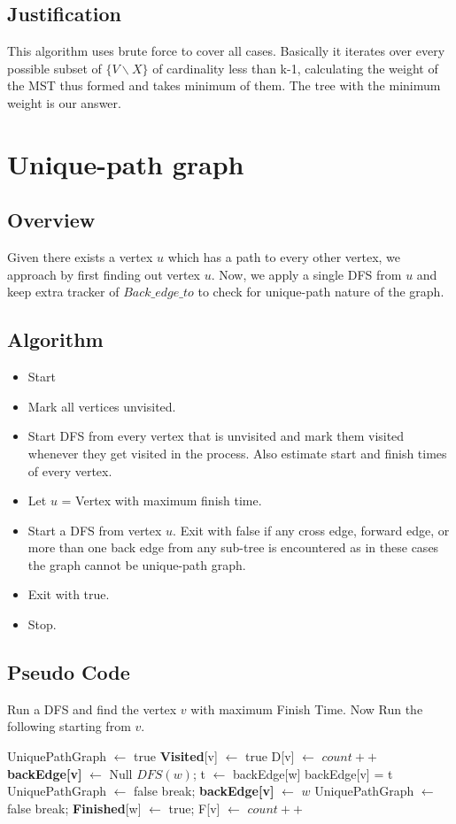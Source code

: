 \documentclass{article}
\begin{document}
\subsection{Justification}
This algorithm uses brute force to cover all cases. Basically it iterates over every possible subset of $\{V\backslash X\}$ of cardinality less than k-1, calculating the weight of the MST thus formed and takes minimum of them. The tree with the minimum weight is our answer.\\  

\newpage
\section{Unique-path graph}
\subsection{Overview}
Given there exists a vertex $u$ which has a path to every other vertex, we approach by first finding out vertex $u$. Now, we apply a single DFS from $u$ and keep extra tracker of $Back\_edge\_to$ to check for unique-path nature of the graph.
\subsection{Algorithm}
\begin{itemize}
\item Start
\item Mark all vertices unvisited. 
\item Start DFS from every vertex that is unvisited and mark them visited whenever they get visited in the process. Also estimate start and finish times of every vertex.
\item Let $u$ = Vertex with maximum finish time.
\item Start a DFS from vertex $u$. Exit with false if any cross edge, forward edge, or more than one back edge from any sub-tree is encountered as in these cases the graph cannot be unique-path graph.
\item Exit with true.
\item Stop.  
\end{itemize}
\subsection{Pseudo Code}
Run a DFS and find the vertex $v$ with maximum Finish Time. Now Run the following starting from $v$. 
\begin{algorithmic}[1]
\State UniquePathGraph $\gets$ true
\State \textbf{Visited}[v] $\gets$ true
\State D[v] $\gets$ $count++$
\State \textbf{backEdge[v]} $\gets$ Null
\State $DFS(w)$;
\State t $\gets$ backEdge[w]
\State backEdge[v] = t
\EndIf
{}
\State UniquePathGraph $\gets$ false
\State break;
\State \textbf{backEdge[v]} $\gets$ $w$
\Else
\State UniquePathGraph $\gets$ false
\State break;
\EndIf
\EndFor
\State \textbf{Finished}[w] $\gets$ true;
\State F[v] $\gets$ $count++$
\EndProcedure
\end{algorithmic}
\end{document}
